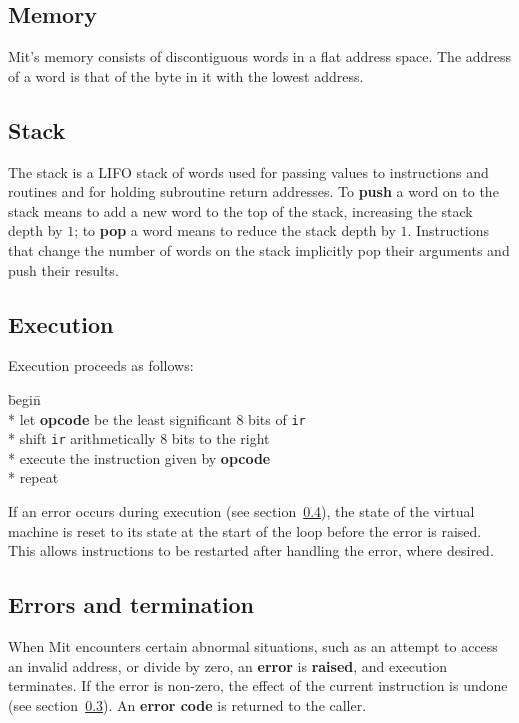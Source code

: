 \documentclass[a4paper]{article}
\begin{document}
\subsection{Memory}

Mit's memory consists of discontiguous words in a flat address space. The address of a word is that of the byte in it with the lowest address.


\subsection{Stack}

The stack is a LIFO stack of words used for passing values to instructions and routines and for holding subroutine return addresses. To {\bf push} a word on to the stack means to add a new word to the top of the stack, increasing the stack depth by $1$; to {\bf pop} a word means to reduce the stack depth by $1$. Instructions that change the number of words on the stack implicitly pop their arguments and push their results.


\subsection{Execution}
\label{execution}

Execution proceeds as follows:

\begin{tabbing}
\hspace{0.5in}\=begin\=\+\+ \\*
let \textbf{opcode} be the least significant $8$ bits of {\tt ir} \\*
shift {\tt ir} arithmetically $8$ bits to the right \\*
execute the instruction given by \textbf{opcode} \- \\*
repeat
\end{tabbing}

If an error occurs during execution (see section~\ref{errors}), the state of the virtual machine is reset to its state at the start of the loop before the error is raised. This allows instructions to be restarted after handling the error, where desired.

\subsection{Errors and termination}
\label{errors}

When Mit encounters certain abnormal situations, such as an attempt to access an invalid address, or divide by zero, an {\bf error} is {\bf raised}, and execution terminates. If the error is non-zero, the effect of the current instruction is undone (see section~\ref{execution}). An {\bf error code} is returned to the caller.
\end{document}
